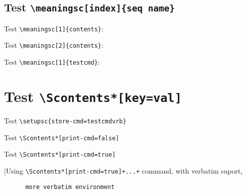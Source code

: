 \documentclass{article}
\begin{document}

\noindent\hrulefill

\subsection{Test \texttt{\textbackslash meaningsc[index]\{seq name\}}}

\noindent\hrulefill

Test \verb+\meaningsc[1]{contents}+:\par


\noindent\hrulefill

Test \verb+\meaningsc[2]{contents}+:\par


\noindent\hrulefill

Test \verb+\meaningsc[1]{testcmd}+:\par


\noindent\hrulefill

\section{Test \texttt{\textbackslash Scontents*[key=val]}}

Test \verb+\setupsc{store-cmd=testcmdvrb}+\par
{}

Test \verb+\Scontents*[print-cmd=false]+\par


Test \verb+\Scontents*[print-cmd=true]+\par
\Scontents*[print-cmd=true]|Using \verb/\Scontents*[print-cmd=true]+...+/ command, with verbatim suport,

\begin{verbatim}
      more verbatim environment
\end{verbatim}
\end{document}
